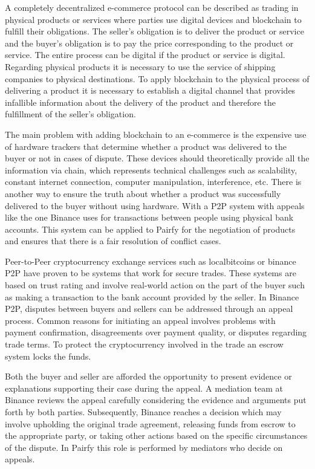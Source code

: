 \documentclass[12pt]{article}
\begin{document}
A completely decentralized e-commerce protocol can be described as trading in physical products or services where parties use digital devices and blockchain to fulfill their obligations.
The seller's obligation is to deliver the product or service and the buyer's obligation is to pay the price corresponding to the product or service. 
The entire process can be digital if the product or service is digital.
Regarding physical products it is necessary to use the service of shipping companies to physical destinations.
To apply blockchain to the physical process of delivering a product it is necessary to establish a digital channel that provides infallible information about the delivery of the product and therefore the fulfillment of the seller's obligation. 

The main problem with adding blockchain to an e-commerce is the expensive use of hardware trackers that determine whether a product was delivered to the buyer or not in cases of dispute. These devices should theoretically provide all the information via chain, which represents technical challenges such as scalability, constant internet connection, computer manipulation, interference, etc. There is another way to ensure the truth about whether a product was successfully delivered to the buyer without using hardware. With a P2P system with appeals like the one Binance uses for transactions between people using physical bank accounts. This system can be applied to Pairfy for the negotiation of products and ensures that there is a fair resolution of conflict cases.

Peer-to-Peer cryptocurrency exchange services such as localbitcoins or binance P2P have proven to be systems that work for secure trades. These systems are based on trust rating and involve real-world action on the part of the buyer such as making a transaction to the bank account provided by the seller. In Binance P2P, disputes between buyers and sellers can be addressed through an appeal process. Common reasons for initiating an appeal involves problems with payment confirmation, disagreements over payment quality, or disputes regarding trade terms. To protect the cryptocurrency involved in the trade an escrow system locks the funds.

Both the buyer and seller are afforded the opportunity to present evidence or explanations supporting their case during the appeal. A mediation team at Binance reviews the appeal carefully considering the evidence and arguments put forth by both parties. Subsequently, Binance reaches a decision which may involve upholding the original trade agreement, releasing funds from escrow to the appropriate party, or taking other actions based on the specific circumstances of the dispute. In Pairfy this role is performed by mediators who decide on appeals.
\end{document}
